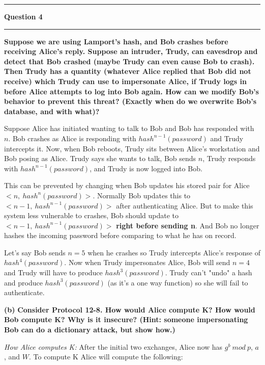 \documentclass[11pt]{article}
\newcommand\question[2]{\vspace{.25in}\hrule\textbf{#1}\vspace{.5em}\hrule\vspace{.10in}}
\renewcommand\part[1]{\vspace{.10in}\textbf{(#1)}}
\begin{document}
\question{Question 4}

\part{a} \textbf{Suppose we are using Lamport's hash, and Bob crashes before receiving Alice's reply. Suppose an intruder, Trudy, can eavesdrop and detect that Bob crashed (maybe Trudy can even cause Bob to crash). Then Trudy has a quantity (whatever Alice replied that Bob did not receive) which Trudy can use to impersonate Alice, if Trudy logs in before Alice attempts to log into Bob again. How can we modify Bob's behavior to prevent this threat? (Exactly when do we overwrite Bob's database, and with what)?}

Suppose Alice has initiated wanting to talk to Bob and Bob has responded with $n$. Bob crashes as Alice is responding with $hash^{n-1}(password)$ and Trudy intercepts it. Now, when Bob reboots, Trudy sits between Alice's workstation and Bob posing as Alice. Trudy says she wants to talk, Bob sends $n$, Trudy responds with $hash^{n-1}(password)$, and Trudy is now logged into Bob.

This can be prevented by changing when Bob updates his stored pair for Alice $<n, \ hash^n(password)>$. Normally Bob updates this to $<n-1, \ hash^{n-1}(password)>$ after authenticating Alice. But to make this system less vulnerable to crashes, Bob should update to $<n-1, \ hash^{n-1}(password)>$ \textbf{right before sending n}. And Bob no longer hashes the incoming password before comparing to what he has on record.

Let's say Bob sends $n = 5$ when he crashes so Trudy intercepts Alice's response of $hash^{4}(password)$. Now when Trudy impersonates Alice, Bob will send $n = 4$ and Trudy will have to produce $hash^{3}(password)$. Trudy can't "undo" a hash and produce $hash^{3}(password)$ (as it's a one way function) so she will fail to authenticate.

\part{b} \textbf{Consider Protocol 12-8. How would Alice compute K? How would Bob compute K? Why is it insecure? (Hint: someone impersonating Bob can do a dictionary attack, but show how.)}

\textit{How Alice computes K:} After the initial two exchanges, Alice now has $g^b \ mod \ p$, $a$, and $W$. To compute K Alice will compute the following:
\end{document}
